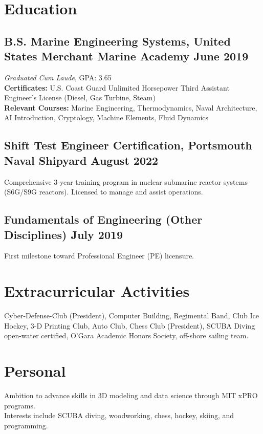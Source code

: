 \documentclass[10pt,a4paper]{article}
\begin{document}
\section*{Education}

\subsection{B.S. Marine Engineering Systems, United States Merchant Marine Academy \hfill June 2019}
\textit{Graduated Cum Laude}, GPA: 3.65 \\
\textbf{Certificates:} U.S. Coast Guard Unlimited Horsepower Third Assistant Engineer’s License (Diesel, Gas Turbine, Steam) \\
\textbf{Relevant Courses:} Marine Engineering, Thermodynamics, Naval Architecture, AI Introduction, Cryptology, Machine Elements, Fluid Dynamics\\

\subsection{Shift Test Engineer Certification, Portsmouth Naval Shipyard \hfill August 2022}
Comprehensive 3-year training program in nuclear submarine reactor systems (S6G/S9G reactors). Licensed to manage and assist operations.\\

\subsection{Fundamentals of Engineering (Other Disciplines) \hfill July 2019}
First milestone toward Professional Engineer (PE) licensure.

\section*{Extracurricular Activities}
Cyber-Defense-Club (President), Computer Building, Regimental Band, Club Ice Hockey, 3-D Printing Club, Auto Club, Chess Club (President), SCUBA Diving open-water certified, O’Gara Academic Honors Society, off-shore sailing team.

\section*{Personal}
Ambition to advance skills in 3D modeling and data science through MIT xPRO programs. \\
Interests include SCUBA diving, woodworking, chess, hockey, skiing, and programming.
\end{document}
